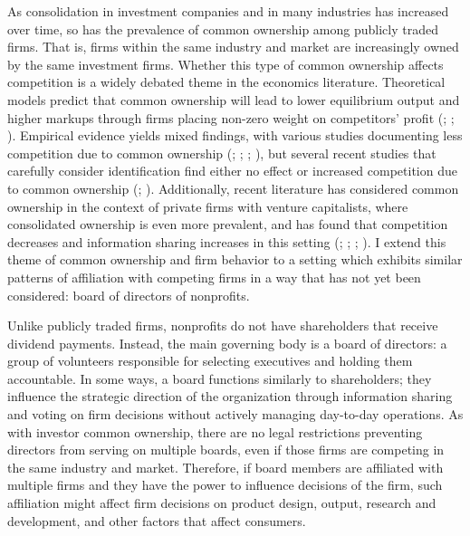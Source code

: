 \documentclass[12pt]{article}
\begin{document}
    As consolidation in investment companies and in many industries has increased over time, so has the prevalence of common ownership among publicly traded firms. That is, firms within the same industry and market are increasingly owned by the same investment firms. Whether this type of common ownership affects competition is a widely debated theme in the economics literature. Theoretical models predict that common ownership will lead to lower equilibrium output and higher markups through firms placing non-zero weight on competitors' profit (\cite{rubinstein1983competitive}; \cite{rotemberg1984financial}; \cite{azar2012new}). Empirical evidence yields mixed findings, with various studies documenting less competition due to common ownership (\cite{he2017product}; \cite{azar2018anticompetitive}; \cite{azar2022ultimate}; \cite{newham2018common}), but several recent studies that carefully consider identification find either no effect or increased competition due to common ownership (\cite{chen2023does}; \cite{kini2024common}). Additionally, recent literature has considered common ownership in the context of private firms with venture capitalists, where consolidated ownership is even more prevalent, and has found that competition decreases and information sharing increases in this setting (\cite{lindsey2008blurring}; \cite{gonzalez2020exchanges}; \cite{li2023common}; \cite{eldar2024common}). I extend this theme of common ownership and firm behavior to a setting which exhibits similar patterns of affiliation with competing firms in a way that has not yet been considered: board of directors of nonprofits. 

    Unlike publicly traded firms, nonprofits do not have shareholders that receive dividend payments. Instead, the main governing body is a board of directors: a group of volunteers responsible for selecting executives and holding them accountable. In some ways, a board functions similarly to shareholders; they influence the strategic direction of the organization through information sharing and voting on firm decisions without actively managing day-to-day operations. As with investor common ownership, there are no legal restrictions preventing directors from serving on multiple boards, even if those firms are competing in the same industry and market. Therefore, if board members are affiliated with multiple firms and they have the power to influence decisions of the firm, such affiliation might affect firm decisions on product design, output, research and development, and other factors that affect consumers. 
    
\end{document}
